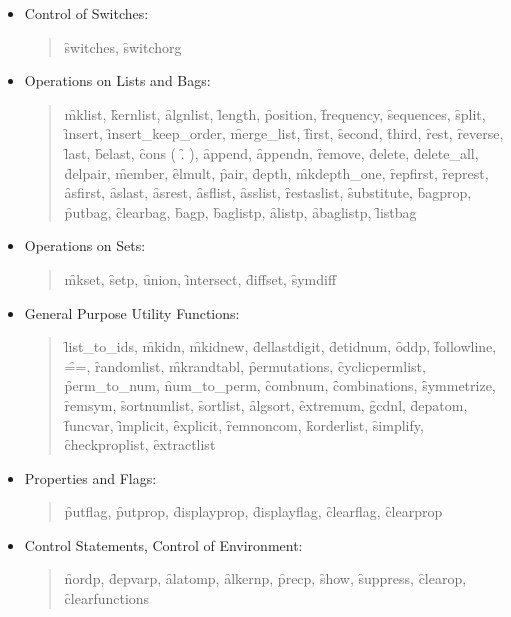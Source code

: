 \begin{itemize}
\item{Control of Switches:}
\begin{quote}\sloppy\raggedright
\f{switches}, \f{switchorg}
\end{quote}
\item{Operations on Lists and Bags:}
\begin{quote}\sloppy\raggedright
\f{mklist}, \f{kernlist}, \f{algnlist}, \f{length},
\f{position}, \f{frequency}, \f{sequences}, \f{split},
\f{insert}, \f{insert\_keep\_order}, \f{merge\_list},
\f{first}, \f{second}, \f{third}, \f{rest}, \f{reverse}, \f{last},
\f{belast}, \f{cons} ( \f{.} ), \f{append}, \f{appendn},
\f{remove}, \f{delete}, \f{delete\_all}, \f{delpair},
\f{member}, \f{elmult}, \f{pair}, \f{depth}, \f{mkdepth\_one},
\f{repfirst}, \f{represt}, \f{asfirst}, \f{aslast}, \f{asrest},
\f{asflist}, \f{asslist}, \f{restaslist}, \f{substitute},
\f{bagprop}, \f{putbag}, \f{clearbag}, \f{bagp}, \f{baglistp},
\f{alistp}, \f{abaglistp}, \f{listbag}
\end{quote}
\item{Operations on Sets:}
\begin{quote}\sloppy\raggedright
\f{mkset}, \f{setp}, \f{union}, \f{intersect}, \f{diffset}, \f{symdiff}
\end{quote}
\item{General Purpose Utility Functions:}
\begin{quote}\sloppy\raggedright
\f{list\_to\_ids}, \f{mkidn}, \f{mkidnew}, \f{dellastdigit}, \f{detidnum},
\f{oddp}, \f{followline}, \f{==}, \f{randomlist}, \f{mkrandtabl},
\f{permutations}, \f{cyclicpermlist}, \f{perm\_to\_num},
\f{num\_to\_perm}, \f{combnum}, \f{combinations}, \f{symmetrize},
\f{remsym}, \f{sortnumlist}, \f{sortlist}, \f{algsort}, \f{extremum}, \f{gcdnl},
\f{depatom}, \f{funcvar}, \f{implicit}, \f{explicit}, \f{remnoncom},
\f{korderlist}, \f{simplify}, \f{checkproplist}, \f{extractlist}
\end{quote}
\item{Properties and Flags:}
\begin{quote}\sloppy\raggedright
\f{putflag}, \f{putprop}, \f{displayprop}, \f{displayflag},
\f{clearflag}, \f{clearprop}
\end{quote}
\item{Control Statements, Control of Environment:}
\begin{quote}\sloppy\raggedright
\f{nordp}, \f{depvarp}, \f{alatomp}, \f{alkernp}, \f{precp},
\f{show}, \f{suppress}, \f{clearop}, \f{clearfunctions}

\end{quote}
\end{itemize}
